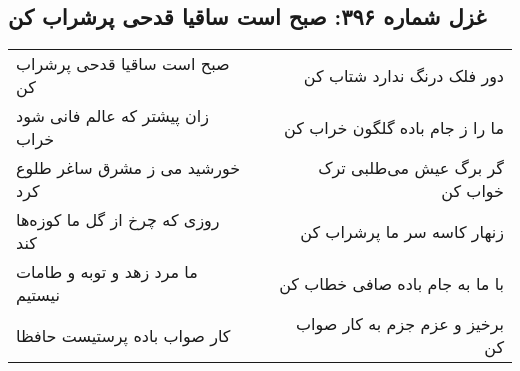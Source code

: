 \begin{center}
\section*{غزل شماره ۳۹۶: صبح است ساقیا قدحی پرشراب کن}
\label{sec:sh396}
\begin{longtable}{l p{0.5cm} r}
صبح است ساقیا قدحی پرشراب کن
&&
دور فلک درنگ ندارد شتاب کن
\\
زان پیشتر که عالم فانی شود خراب
&&
ما را ز جام باده گلگون خراب کن
\\
خورشید می ز مشرق ساغر طلوع کرد
&&
گر برگ عیش می‌طلبی ترک خواب کن
\\
روزی که چرخ از گل ما کوزه‌ها کند
&&
زنهار کاسه سر ما پرشراب کن
\\
ما مرد زهد و توبه و طامات نیستیم
&&
با ما به جام باده صافی خطاب کن
\\
کار صواب باده پرستیست حافظا
&&
برخیز و عزم جزم به کار صواب کن
\\
\end{longtable}
\end{center}
